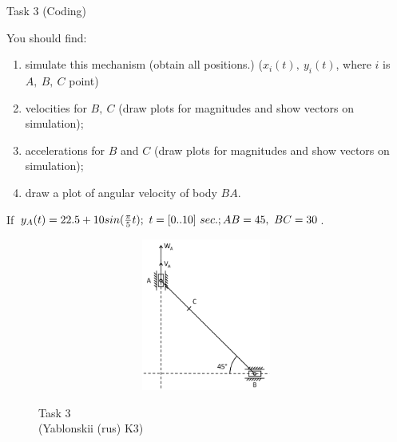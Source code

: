 \documentclass[aspectratio=169]{beamer}
\newcommand{\fbckg}[1]{\usebackgroundtemplate{\texttt{[image: \#1]}}}%
\begin{document}
\begin{frame}[t]{Task 3 (Coding)}
    \begin{minipage}{0.6\textwidth}
        You should find:
        \begin{enumerate}
            \item simulate this mechanism (obtain all positions.) ($x_i(t),\ y_i(t)$, where $i$ is $A,\ B,\ C$ point)
            \item velocities for $B,\ C$ (draw plots for magnitudes and show vectors on simulation);
            \item accelerations for $B$ and $C$ (draw plots for magnitudes and show vectors on simulation);
            \item draw a plot of angular velocity of body $BA$.
        \end{enumerate}
        If $ y_A(t)=22.5+10sin(\frac{\pi}{5}t);\ t = [0..10]\ sec.;\\ AB=45,\ BC=30$.  \\
        \end{minipage}
        \begin{minipage}{0.39\textwidth}
            \vspace{-0.2cm}
              \begin{figure}[H]
            \includegraphics[height=5cm, width=0.99\textwidth, keepaspectratio]{HW1_3.png}\\
            \caption*{Task 3 \\ (Yablonskii (rus) K3)}
            \end{figure}
        \end{minipage}
\end{frame}

\fbckg{fibeamer/figs/last_page.png}
\frame[plain]{}
\end{document}
